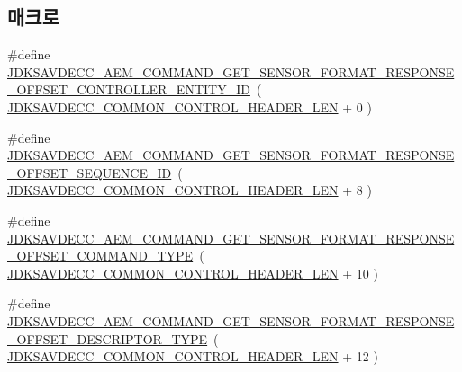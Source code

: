 \subsection*{매크로}
\begin{DoxyCompactItemize}
\item 
\#define \hyperlink{group__command__get__sensor__format__response_ga81dbf2631efb6a1401b7fb342cd4ea27}{J\+D\+K\+S\+A\+V\+D\+E\+C\+C\+\_\+\+A\+E\+M\+\_\+\+C\+O\+M\+M\+A\+N\+D\+\_\+\+G\+E\+T\+\_\+\+S\+E\+N\+S\+O\+R\+\_\+\+F\+O\+R\+M\+A\+T\+\_\+\+R\+E\+S\+P\+O\+N\+S\+E\+\_\+\+O\+F\+F\+S\+E\+T\+\_\+\+C\+O\+N\+T\+R\+O\+L\+L\+E\+R\+\_\+\+E\+N\+T\+I\+T\+Y\+\_\+\+ID}~( \hyperlink{group__jdksavdecc__avtp__common__control__header_gaae84052886fb1bb42f3bc5f85b741dff}{J\+D\+K\+S\+A\+V\+D\+E\+C\+C\+\_\+\+C\+O\+M\+M\+O\+N\+\_\+\+C\+O\+N\+T\+R\+O\+L\+\_\+\+H\+E\+A\+D\+E\+R\+\_\+\+L\+EN} + 0 )
\item 
\#define \hyperlink{group__command__get__sensor__format__response_gaa20a3b48a706890413096efe714ad444}{J\+D\+K\+S\+A\+V\+D\+E\+C\+C\+\_\+\+A\+E\+M\+\_\+\+C\+O\+M\+M\+A\+N\+D\+\_\+\+G\+E\+T\+\_\+\+S\+E\+N\+S\+O\+R\+\_\+\+F\+O\+R\+M\+A\+T\+\_\+\+R\+E\+S\+P\+O\+N\+S\+E\+\_\+\+O\+F\+F\+S\+E\+T\+\_\+\+S\+E\+Q\+U\+E\+N\+C\+E\+\_\+\+ID}~( \hyperlink{group__jdksavdecc__avtp__common__control__header_gaae84052886fb1bb42f3bc5f85b741dff}{J\+D\+K\+S\+A\+V\+D\+E\+C\+C\+\_\+\+C\+O\+M\+M\+O\+N\+\_\+\+C\+O\+N\+T\+R\+O\+L\+\_\+\+H\+E\+A\+D\+E\+R\+\_\+\+L\+EN} + 8 )
\item 
\#define \hyperlink{group__command__get__sensor__format__response_ga3b6c3b3a1c1231a32dcb997b8c99ae5f}{J\+D\+K\+S\+A\+V\+D\+E\+C\+C\+\_\+\+A\+E\+M\+\_\+\+C\+O\+M\+M\+A\+N\+D\+\_\+\+G\+E\+T\+\_\+\+S\+E\+N\+S\+O\+R\+\_\+\+F\+O\+R\+M\+A\+T\+\_\+\+R\+E\+S\+P\+O\+N\+S\+E\+\_\+\+O\+F\+F\+S\+E\+T\+\_\+\+C\+O\+M\+M\+A\+N\+D\+\_\+\+T\+Y\+PE}~( \hyperlink{group__jdksavdecc__avtp__common__control__header_gaae84052886fb1bb42f3bc5f85b741dff}{J\+D\+K\+S\+A\+V\+D\+E\+C\+C\+\_\+\+C\+O\+M\+M\+O\+N\+\_\+\+C\+O\+N\+T\+R\+O\+L\+\_\+\+H\+E\+A\+D\+E\+R\+\_\+\+L\+EN} + 10 )
\item 
\#define \hyperlink{group__command__get__sensor__format__response_gac311d41c6823d30cb7b5664683db492b}{J\+D\+K\+S\+A\+V\+D\+E\+C\+C\+\_\+\+A\+E\+M\+\_\+\+C\+O\+M\+M\+A\+N\+D\+\_\+\+G\+E\+T\+\_\+\+S\+E\+N\+S\+O\+R\+\_\+\+F\+O\+R\+M\+A\+T\+\_\+\+R\+E\+S\+P\+O\+N\+S\+E\+\_\+\+O\+F\+F\+S\+E\+T\+\_\+\+D\+E\+S\+C\+R\+I\+P\+T\+O\+R\+\_\+\+T\+Y\+PE}~( \hyperlink{group__jdksavdecc__avtp__common__control__header_gaae84052886fb1bb42f3bc5f85b741dff}{J\+D\+K\+S\+A\+V\+D\+E\+C\+C\+\_\+\+C\+O\+M\+M\+O\+N\+\_\+\+C\+O\+N\+T\+R\+O\+L\+\_\+\+H\+E\+A\+D\+E\+R\+\_\+\+L\+EN} + 12 )

\end{DoxyCompactItemize}
